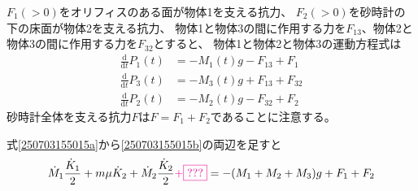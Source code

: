 \documentclass[]{article}
\begin{document}
%
%
%





$F_1 (>0)$をオリフィスのある面が物体1を支える抗力、
$F_2 (>0)$を砂時計の下の床面が物体2を支える抗力、
物体1と物体3の間に作用する力を$F_{13}$、物体2と物体3の間に作用する力を$F_{32}$とすると、
物体1と物体2と物体3の運動方程式は
\begin{align}
   \frac{\mathrm{d} }{\mathrm{d} t}  P_1(t) &=   - M_1(t) g - F_{13} + F_1\label{250703155015a}  \\
   \frac{\mathrm{d} }{\mathrm{d} t} P_3(t) &=  - M_3(t) g  + F_{13} + F_{32} \label{2507031550153c} \\
   \frac{\mathrm{d} }{\mathrm{d} t} P_2(t)  &=  - M_2(t) g  - F_{32} + F_2 \label{250703155015b} 
\end{align}
砂時計全体を支える抗力$F$は$F=F_1+F_2$であることに注意する。


式\eqref{250703155015a}から\eqref{250703155015b}の両辺を足すと
\begin{equation} \label{250917103450} 
  \dot{M}_1 \frac{\dot{K}_1}{2}  + m \mu \dot{K}_2 + \dot{M}_2 \frac{\dot{K}_2}{2} \textcolor{magenta}{+\fbox{???}} =  -(M_1+M_2+M_3) g + F_1 + F_2
\end{equation}
\end{document}
